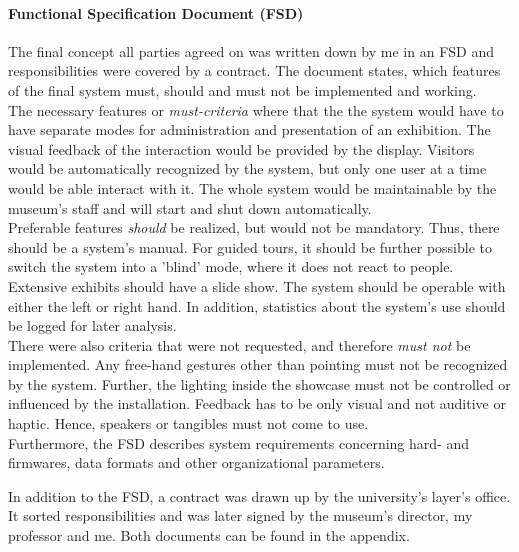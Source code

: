 \paragraph{Functional Specification Document (\ac{FSD})} The final concept all parties agreed on was written down by me in an \ac{FSD} and responsibilities were covered by a contract. The document states, which features of the final system must, should and must not be implemented and working.
\\
The necessary features or \textit{must-criteria} where that the the system would have to have separate modes for administration and presentation of an exhibition. The visual feedback of the interaction would be provided by the display. Visitors would be automatically recognized by the system, but only one user at a time would be able interact with it. The whole system would be maintainable by the museum's staff and will start and shut down automatically.
\\
Preferable features \textit{should} be realized, but would not be mandatory. Thus, there should be a system's manual. For guided tours, it should be further possible to switch the system into a 'blind' mode, where it does not react to people. Extensive exhibits should have a slide show. The system should be operable with either the left or right hand. In addition, statistics about the system's use should be logged for later analysis.
\\
There were also criteria that were not requested, and therefore \textit{must not} be implemented. Any free-hand gestures other than pointing must not be recognized by the system. Further, the lighting inside the showcase must not be controlled or influenced by the installation. Feedback has to be only visual and not auditive or haptic. Hence, speakers or tangibles must not come to use. 
\\
Furthermore, the \ac{FSD} describes system requirements concerning hard- and firmwares, data formats and other organizational parameters. 

In addition to the \ac{FSD}, a contract was drawn up by the university's layer's office. It sorted responsibilities and was later signed by the museum's director, my professor and me. Both documents can be found in the appendix.

